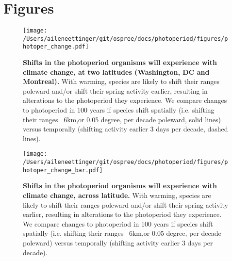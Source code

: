 \documentclass{article}
\begin{document}
\section* {Figures}
\begin{figure}[p]
\centering
\texttt{[image: /Users/aileneettinger/git/ospree/docs/photoperiod/figures/photoper\_change.pdf]} 
\caption{\textbf{Shifts in the photoperiod organisms will experience with climate change, at two latitudes (Washington, DC and Montreal).}  With warming, species are likely to shift their ranges poleward and/or shift their spring activity earlier, resulting in alterations to the photoperiod they experience. We compare changes to photoperiod in 100 years if species shift spatially (i.e. shifting their ranges ~6km,or 0.05 degree, per decade poleward, solid lines) versus temporally (shifting activity earlier 3 days per decade, dashed lines).}
 \label{fig:photo}
 \end{figure}
\begin{figure}[p]
\centering
\texttt{[image: /Users/aileneettinger/git/ospree/docs/photoperiod/figures/photoper\_change\_bar.pdf]} 
\caption{\textbf{Shifts in the photoperiod organisms will experience with climate change, across latitude.}  With warming, species are likely to shift their ranges poleward and/or shift their spring activity earlier, resulting in alterations to the photoperiod they experience. We compare changes to photoperiod in 100 years if species shift spatially (i.e. shifting their ranges ~6km,or 0.05 degree, per decade poleward) versus temporally (shifting activity earlier 3 days per decade).}
 \label{fig:photo_bar}
 \end{figure}
\clearpage



\end{document}
